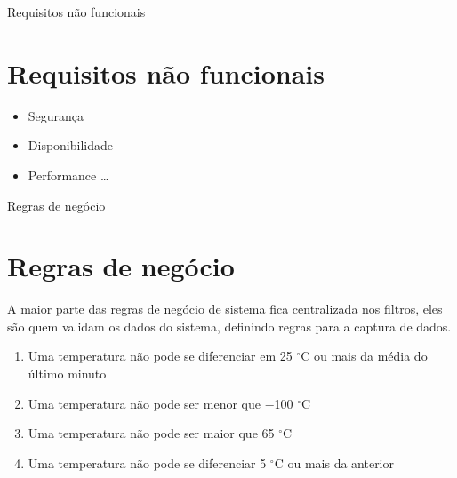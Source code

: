 \documentclass[aspectratio=43]{beamer}
\begin{document}
\begin{frame}{Requisitos não funcionais}
\section{Requisitos não funcionais}
\begin{itemize}
\item Segurança
\item Disponibilidade
\item Performance \ldots
\end{itemize}
\end{frame}

\begin{frame}{Regras de negócio}
\section{Regras de negócio}
A maior parte das regras de negócio de sistema fica centralizada nos filtros, eles são quem validam os dados do sistema, definindo regras para a captura de dados.

\begin{enumerate}
\item{Uma temperatura não pode se diferenciar em 25 $^{\circ}$C ou mais da média do último minuto}
\item{Uma temperatura não pode ser menor que \num{-100} $^{\circ}$C}
\item{Uma temperatura não pode ser maior que \num{+65} $^{\circ}$C}
\item{Uma temperatura não pode se diferenciar 5 $^{\circ}$C ou mais da anterior}
\end{enumerate}
\end{frame}
\end{document}
